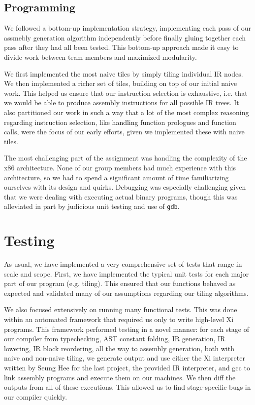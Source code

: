 \documentclass{hw}
\begin{document}
\subsection{Programming}
We followed a bottom-up implementation strategy, implementing each pass of our
assmebly generation algorithm independently before finally gluing together each
pass after they had all been tested. This bottom-up approach made it easy to
divide work between team members and maximized modularity.

We first implemented the most naive tiles by simply tiling individual IR nodes.
We then implemented a richer set of tiles, building on top of our initial naive
work. This helped us ensure that our instruction selection is exhaustive, i.e.
that we would be able to produce assembly instructions for all possible IR trees.
It also partitioned our work in such a way that a lot of the most complex reasoning
regarding instruction selection, like handling function prologues and function calls,
were the focus of our early efforts, given we implemented these with naive tiles. 

The most challenging part of the assignment was handling the complexity of the x86
architecture. None of our group members had much experience with this architecture,
so we had to spend a significant amount of time familiarizing ourselves with
its design and quirks. Debugging was especially challenging given that we were
dealing with executing actual binary programs, though this was alleviated in part
by judicious unit testing and use of \texttt{gdb}.

\section{Testing}\label{sec:testing}
As usual, we have implemented a very comprehensive set of tests that range in
scale and scope. First, we have implemented the typical unit tests for each major
part of our program (e.g. tiling). This ensured that our functions behaved as
expected and validated many of our assumptions regarding our tiling algorithms.

We also focused extensively on running many functional tests. This was done within
an automated framework that required us only to write high-level Xi programs. This
framework performed testing in a novel manner: for each stage of our compiler from
typechecking, AST constant folding, IR generation, IR lowering, IR block reordering,
all the way to assembly generation, both with naive and non-naive tiling, we generate
output and use either the Xi interpreter written by Seung Hee for the last project,
the provided IR interpreter, and gcc to link assembly programs and execute them on our
machines. We then diff the outputs from all of these executions. This allowed us to find
stage-specific bugs in our compiler quickly.
\end{document}
